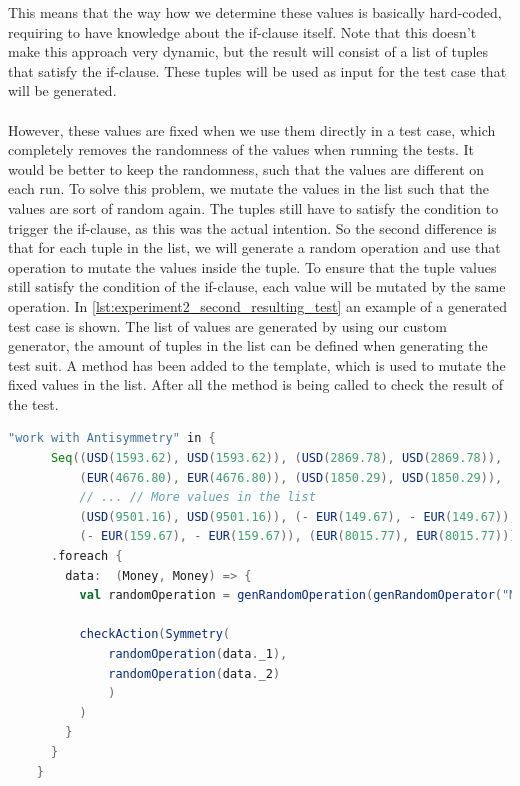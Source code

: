 \FloatBarrier
This means that the way how we determine these values is basically hard-coded, requiring to have knowledge about the if-clause itself. Note that this doesn't make this approach very dynamic, but the result will consist of a list of tuples that satisfy the if-clause. These tuples will be used as input for the test case that will be generated.\\
\\
However, these values are fixed when we use them directly in a test case, which completely removes the randomness of the values when running the tests. It would be better to keep the randomness, such that the values are different on each run. To solve this problem, we mutate the values in the list such that the values are sort of random again. The tuples still have to satisfy the condition to trigger the if-clause, as this was the actual intention. So the second difference is that for each tuple in the list, we will generate a random operation and use that operation to mutate the values inside the tuple. To ensure that the tuple values still satisfy the condition of the if-clause, each value will be mutated by the same operation. In \autoref{lst:experiment2_second_resulting_test} an example of a generated test case is shown. The list of values are generated by using our custom generator, the amount of tuples in the list can be defined when generating the test suit. A method  has been added to the template, which is used to mutate the fixed values in the list. After all the  method is being called to check the result of the test.
\FloatBarrier
\begin{sourcecode}[!ht]
\begin{lstlisting}[language=Scala]
"work with Antisymmetry" in {
      Seq((USD(1593.62), USD(1593.62)), (USD(2869.78), USD(2869.78)),
          (EUR(4676.80), EUR(4676.80)), (USD(1850.29), USD(1850.29)),
          // ... // More values in the list
          (USD(9501.16), USD(9501.16)), (- EUR(149.67), - EUR(149.67)),
          (- EUR(159.67), - EUR(159.67)), (EUR(8015.77), EUR(8015.77)))
      .foreach {
        data:  (Money, Money) => {
          val randomOperation = genRandomOperation(genRandomOperator("Money", true), generateRandomMoney(data._1.currency), generateRandomInteger(true), generateRandomInteger(false), generateRandomPercentage(true), generateRandomPercentage(false), Random.nextInt(10))

          checkAction(Symmetry(
              randomOperation(data._1),
              randomOperation(data._2)
              )
          )
        }
      }
    }
\end{lstlisting}
\caption{Resulting test case with semi-random values. Omitted some input tuples for readability.}
\label{lst:experiment2_second_resulting_test}
\end{sourcecode}
